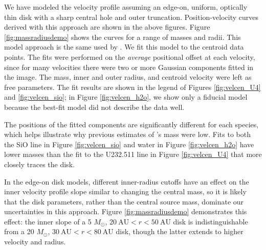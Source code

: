\documentclass[twocolumn]{aastex61}
\newcommand{\msun}{\ensuremath{M_{\odot}}\xspace}			%
\newcommand{\water}{H$_{2}$O\xspace}		%
\newcommand{\kms}{\textrm{km~s}\ensuremath{^{-1}}\xspace}	%
\begin{document}
We have modeled the velocity profile assuming an edge-on, uniform, optically
thin disk with a sharp central hole and outer truncation.  Position-velocity
curves derived with this approach are shown in the above figures. Figure
\ref{fig:massradiusdemo} shows the curves for a range of masses and radii.
This model approach is the same used by \citet{Plambeck2016a}.  We fit this
model to the centroid data points.  The fits were performed on the
\emph{average} positional offset at each velocity, since for many velocities
there were two or more Gaussian components fitted in the image.  The mass,
inner and outer radius, and centroid velocity were left as free parameters.
The fit results are shown in the legend of Figures 
\ref{fig:velcen_U4} and \ref{fig:velcen_sio}; in Figure \ref{fig:velcen_h2o},
we show only a fiducial model because the best-fit model did not describe
the data well.

The positions of the fitted components are significantly different for each
species, which helps illustrate why previous estimates of \sourcei's mass were
low.  Fits to both the SiO line in Figure \ref{fig:velcen_sio} and water in
Figure \ref{fig:velcen_h2o} have lower masses than the fit to the U232.511 line
in Figure \ref{fig:velcen_U4} that more closely traces the disk.





In the edge-on disk models, different inner-radius cutoffs have an effect on
the inner velocity profile slope similar to changing the central mass, so it is
likely that the disk parameters, rather than the central source mass, dominate
our uncertainties in this approach.  
Figure \ref{fig:massradiusdemo} demonstrates this effect: the inner slope of
a 5 \msun, $20~\mathrm{AU} < r < 50~\mathrm{AU}$ disk is indistinguishable
from a 20 \msun , $30~\mathrm{AU} < r < 80~\mathrm{AU}$ disk, though the latter
extends to higher velocity and radius.
\end{document}
